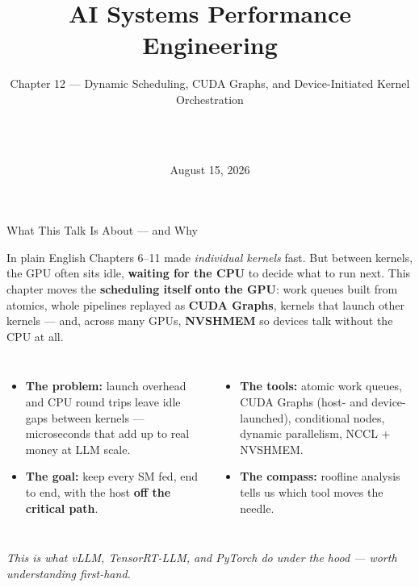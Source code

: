 \documentclass[aspectratio=169]{beamer}
\title[AI Systems Performance Engineering]{AI Systems Performance Engineering}
\subtitle{Chapter 12 --- Dynamic Scheduling, CUDA Graphs, and Device-Initiated Kernel Orchestration}
\author[\PresenterName\ \ \PresenterTitle\ \ \PresenterOrg]{\PresenterName\\\PresenterTitle\\\PresenterOrg}
\institute[]{\footnotesize Internal Training for Applied Scientists on AI Infrastructure}
\date{August 15, 2026}
\newcommand{\kw}[1]{\textbf{\textcolor{kwblue}{#1}}}
\begin{document}
\begin{frame}
  \titlepage
\end{frame}

\begin{frame}{What This Talk Is About --- and Why}
  \begin{block}{In plain English}
    Chapters 6--11 made \emph{individual kernels} fast. But between kernels, the GPU often sits idle,
    \kw{waiting for the CPU} to decide what to run next. This chapter moves the \kw{scheduling itself onto
    the GPU}: work queues built from atomics, whole pipelines replayed as \kw{CUDA Graphs}, kernels that
    launch other kernels --- and, across many GPUs, \kw{NVSHMEM} so devices talk without the CPU at all.
  \end{block}
  \begin{columns}[t]
    \begin{itemize}
      \item \kw{The problem:} launch overhead and CPU round trips leave idle gaps between kernels ---
            microseconds that add up to real money at LLM scale.
      \item \kw{The goal:} keep every SM fed, end to end, with the host \kw{off the critical path}.
    \end{itemize}
    \begin{itemize}
      \item \kw{The tools:} atomic work queues, CUDA Graphs (host- and device-launched),
            conditional nodes, dynamic parallelism, NCCL + NVSHMEM.
      \item \kw{The compass:} roofline analysis tells us which tool moves the needle.
    \end{itemize}
  \end{columns}
  \medskip
  \centering\footnotesize\itshape
  This is what vLLM, TensorRT-LLM, and PyTorch do under the hood --- worth understanding first-hand.
\end{frame}
\end{document}
